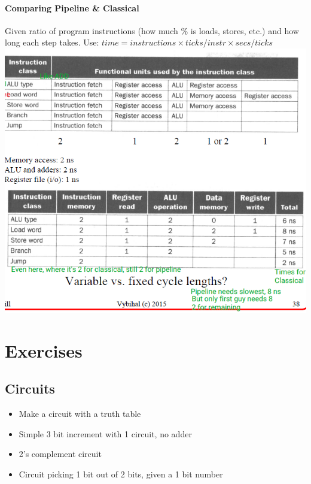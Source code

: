 \documentclass[12 pt]{article}
\begin{document}
		\paragraph{Comparing Pipeline \& Classical}
		Given ratio of program instructions (how much \% is loads, stores, etc.) and how long each step takes. Use: $time=instructions \times ticks/instr \times secs/ticks$
		\includegraphics[scale=0.6]{vfx}
		\section{Exercises}
		\subsection{Circuits}
		\begin{itemize}
			\item Make a circuit with a truth table
			\item Simple 3 bit increment with 1 circuit, no adder
			\item 2's complement circuit
			\item Circuit picking 1 bit out of 2 bits, given a 1 bit number
			\end{itemize}
\end{document}
